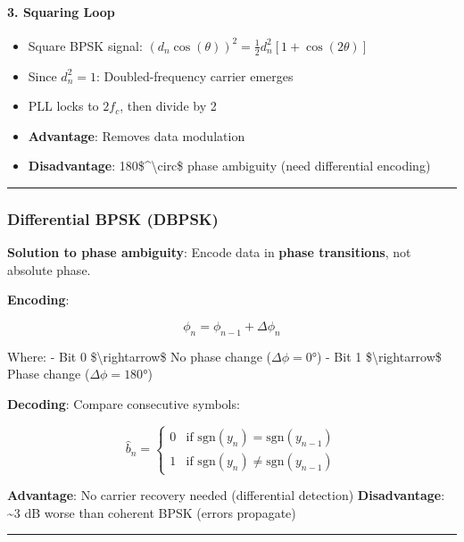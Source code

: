 \paragraph{3. Squaring Loop}\label{squaring-loop}

\begin{itemize}
\tightlist
\item
  Square BPSK signal:
  \((d_n \cos(\theta))^2 = \frac{1}{2}d_n^2[1 + \cos(2\theta)]\)
\item
  Since \(d_n^2 = 1\): Doubled-frequency carrier emerges
\item
  PLL locks to \(2f_c\), then divide by 2
\item
  \textbf{Advantage}: Removes data modulation
\item
  \textbf{Disadvantage}: 180\$\^{}\textbackslash circ\$ phase ambiguity
  (need differential encoding)
\end{itemize}

\begin{center}\rule{0.5\linewidth}{0.5pt}\end{center}

\subsubsection{Differential BPSK (DBPSK)}\label{differential-bpsk-dbpsk}

\textbf{Solution to phase ambiguity}: Encode data in \textbf{phase
transitions}, not absolute phase.

\textbf{Encoding}:

\[
\phi_n = \phi_{n-1} + \Delta\phi_n
\]

Where: - Bit 0 \$\textbackslash rightarrow\$ No phase change
(\(\Delta\phi = 0°\)) - Bit 1 \$\textbackslash rightarrow\$ Phase change
(\(\Delta\phi = 180°\))

\textbf{Decoding}: Compare consecutive symbols:

\[
\hat{b}_n = \begin{cases}
0 & \text{if } \text{sgn}(y_n) = \text{sgn}(y_{n-1}) \\
1 & \text{if } \text{sgn}(y_n) \neq \text{sgn}(y_{n-1})
\end{cases}
\]

\textbf{Advantage}: No carrier recovery needed (differential detection)
\textbf{Disadvantage}: \textasciitilde3 dB worse than coherent BPSK
(errors propagate)

\begin{center}\rule{0.5\linewidth}{0.5pt}\end{center}

